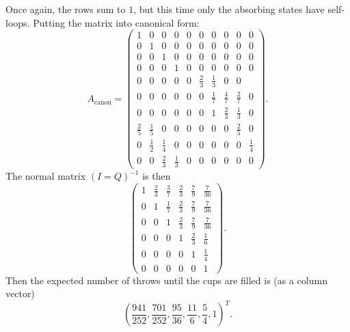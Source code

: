 \documentclass[12pt]{article}
\begin{document}
\begin{solution}
\begin{enumerate}[label=(\alph*)]
        Once again, the rows sum to \( 1 \), but this time only the
        absorbing states have self-loops.  Putting the matrix into
        canonical form:
        \[
            A_{\text{canon}} =
            \begin{pmatrix}
                1 & 0 & 0 & 0 & 0 & 0 & 0 & 0 & 0 & 0\\
                0 & 1 & 0 & 0 & 0 & 0 & 0 & 0 & 0 & 0\\
                0 & 0 & 1 & 0 & 0 & 0 & 0 & 0 & 0 & 0\\
                0 & 0 & 0 & 1 & 0 & 0 & 0 & 0 & 0 & 0\\
                0 & 0 & 0 & 0 & 0 & \frac{2}{3} & \frac{1}{3} & 0 & 0\\
                0 & 0 & 0 & 0 & 0 & 0 & \frac{1}{7} & \frac{4}{7} &
                \frac{2}{7} & 0\\
                0 & 0 & 0 & 0 & 0 & 0 & 1 & \frac{2}{3} & \frac{1}{3} &
                0\\
                \frac{2}{5} & \frac{1}{5} & 0 & 0 & 0 & 0 & 0 & 0 &
                \frac{2}{5} & 0\\
                0 & \frac{1}{2} & \frac{1}{4} & 0 & 0 & 0 & 0 & 0 & 0 &
                \frac{1}{4} \\
                0 & 0 & \frac{2}{3} & \frac{1}{3} & 0 & 0 & 0 & 0 & 0 &
                0
            \end{pmatrix}
            .
        \] The normal matrix \( (I = Q)^{-1} \) is then
        \[
            \begin{pmatrix}
                1 & \frac{2}{3} & \frac{3}{7} & \frac{2}{3} & \frac{7}{9}
                & \frac{7}{36}\\
                0 & 1 & \frac{1}{7} & \frac{2}{3} & \frac{7}{9} & \frac{7}
                {36}\\
                0 & 0 & 1 & \frac{2}{3} & \frac{7}{9} & \frac{7}{36}\\
                0 & 0 & 0 & 1 & \frac{2}{3} & \frac{1}{6}\\
                0 & 0 & 0 & 0 & 1 & \frac{1}{4}\\
                0 & 0 & 0 & 0 & 0 & 1
            \end{pmatrix}
            .
        \] Then the expected number of throws until the cups are filled
        is (as a column vector)
        \[
            \left( \frac{941}{252}, \frac{701}{252}, \frac{95}{36},
            \frac{11}{6}, \frac{5}{4}, 1 \right)^{T}.
        \]


\end{enumerate}
\end{solution}
\end{document}
